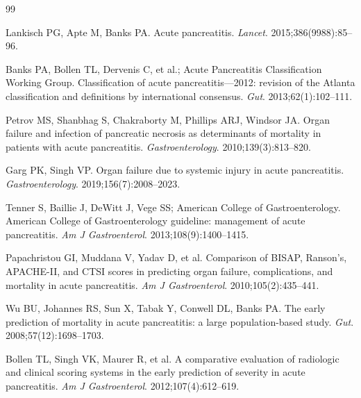 \documentclass[12pt,a4paper]{article}
\begin{document}
\begin{thebibliography}{99}

Lankisch PG, Apte M, Banks PA.
\newblock Acute pancreatitis.
\newblock \textit{Lancet}. 2015;386(9988):85--96.
\newblock {}

Banks PA, Bollen TL, Dervenis C, et al.; Acute Pancreatitis Classification Working Group.
\newblock Classification of acute pancreatitis—2012: revision of the Atlanta classification and definitions by international consensus.
\newblock \textit{Gut}. 2013;62(1):102--111.
\newblock {}

Petrov MS, Shanbhag S, Chakraborty M, Phillips ARJ, Windsor JA.
\newblock Organ failure and infection of pancreatic necrosis as determinants of mortality in patients with acute pancreatitis.
\newblock \textit{Gastroenterology}. 2010;139(3):813--820.
\newblock {}

Garg PK, Singh VP.
\newblock Organ failure due to systemic injury in acute pancreatitis.
\newblock \textit{Gastroenterology}. 2019;156(7):2008--2023.
\newblock {}

Tenner S, Baillie J, DeWitt J, Vege SS; American College of Gastroenterology.
\newblock American College of Gastroenterology guideline: management of acute pancreatitis.
\newblock \textit{Am J Gastroenterol}. 2013;108(9):1400--1415.
\newblock {}

Papachristou GI, Muddana V, Yadav D, et al.
\newblock Comparison of BISAP, Ranson's, APACHE-II, and CTSI scores in predicting organ failure, complications, and mortality in acute pancreatitis.
\newblock \textit{Am J Gastroenterol}. 2010;105(2):435--441.
\newblock {}

Wu BU, Johannes RS, Sun X, Tabak Y, Conwell DL, Banks PA.
\newblock The early prediction of mortality in acute pancreatitis: a large population-based study.
\newblock \textit{Gut}. 2008;57(12):1698--1703.
\newblock {}

Bollen TL, Singh VK, Maurer R, et al.
\newblock A comparative evaluation of radiologic and clinical scoring systems in the early prediction of severity in acute pancreatitis.
\newblock \textit{Am J Gastroenterol}. 2012;107(4):612--619.
\newblock {}


\end{thebibliography}
\end{document}
